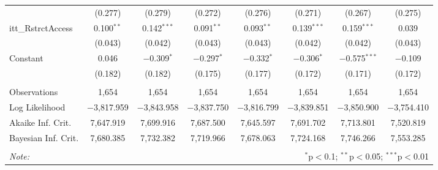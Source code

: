 \begin{sidewaystable}[!htbp]
\begin{tabular}{@{\extracolsep{5pt}}lccccccc}
  & (0.277) & (0.279) & (0.272) & (0.276) & (0.271) & (0.267) & (0.275) \\ 
  itt\_RstrctAccess & 0.100$^{**}$ & 0.142$^{***}$ & 0.091$^{**}$ & 0.093$^{**}$ & 0.139$^{***}$ & 0.159$^{***}$ & 0.039 \\ 
  & (0.043) & (0.042) & (0.043) & (0.043) & (0.042) & (0.042) & (0.043) \\ 
  Constant & 0.046 & $-$0.309$^{*}$ & $-$0.297$^{*}$ & $-$0.332$^{*}$ & $-$0.306$^{*}$ & $-$0.575$^{***}$ & $-$0.109 \\ 
  & (0.182) & (0.182) & (0.175) & (0.177) & (0.172) & (0.171) & (0.172) \\ 
 \hline \\[-1.8ex] 
Observations & 1,654 & 1,654 & 1,654 & 1,654 & 1,654 & 1,654 & 1,654 \\ 
Log Likelihood & $-$3,817.959 & $-$3,843.958 & $-$3,837.750 & $-$3,816.799 & $-$3,839.851 & $-$3,850.900 & $-$3,754.410 \\ 
Akaike Inf. Crit. & 7,647.919 & 7,699.916 & 7,687.500 & 7,645.597 & 7,691.702 & 7,713.801 & 7,520.819 \\ 
Bayesian Inf. Crit. & 7,680.385 & 7,732.382 & 7,719.966 & 7,678.063 & 7,724.168 & 7,746.266 & 7,553.285 \\ 
\hline 
\hline \\[-1.8ex] 
\textit{Note:}  & \multicolumn{7}{r}{$^{*}$p$<$0.1; $^{**}$p$<$0.05; $^{***}$p$<$0.01} \\ 
\end{tabular} 
\end{sidewaystable} 
